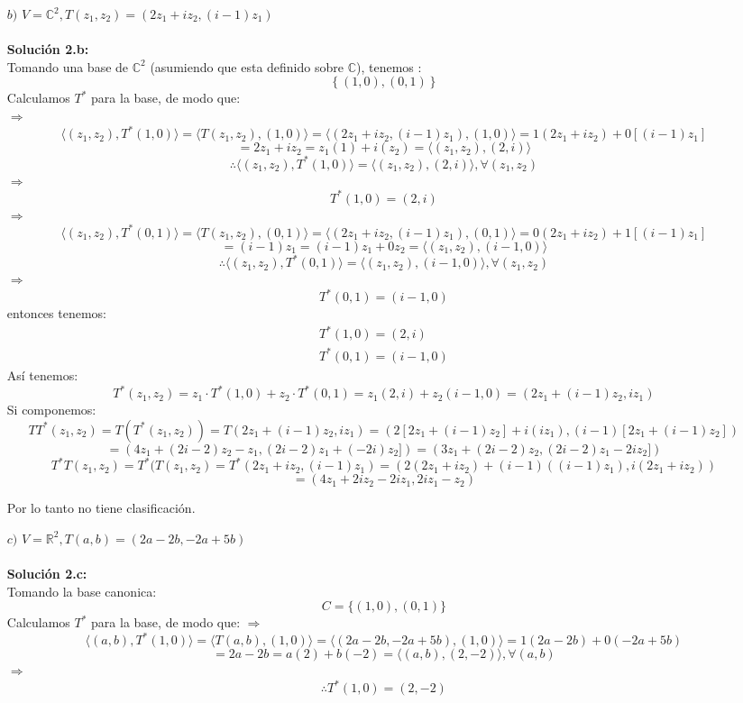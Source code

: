 \begin{itemize}
    \item [$b)$] $V=\mathbb{C}^2, T(z_1,z_2)=(2z_1+iz_2,(i-1)z_1)$\\\\
        \textbf{Soluci\'on 2.b:}\\
        Tomando una base de $\mathbb{C}^2$ (asumiendo que esta definido sobre $\mathbb{C}$), tenemos : $$\left \{ (1,0),(0,1) \right \}$$
        Calculamos $T^*$ para la base, de modo que:\\
        $\Rightarrow$
        $$\langle (z_1,z_2),T^*(1,0)\rangle =\langle T(z_1,z_2),(1,0)\rangle  =\langle (2z_1+iz_2,(i-1)z_1),(1,0)\rangle=1(2z_1+iz_2)+0[(i-1)z_1]$$
        $$=2z_1+iz_2=z_1(1)+i(z_2)=\langle (z_1,z_2),(2,i)\rangle$$
        \[\therefore \langle (z_1,z_2),T^*(1,0)\rangle =\langle (z_1,z_2),(2,i)\rangle , \forall (z_1,z_2)\]
        $\Rightarrow$
        $$T^*(1,0)=(2,i)$$
        $\Rightarrow$
        $$\langle (z_1,z_2),T^*(0,1)\rangle =\langle T(z_1,z_2),(0,1)\rangle  =\langle (2z_1+iz_2,(i-1)z_1),(0,1)\rangle=0(2z_1+iz_2)+1[(i-1)z_1]$$ $$=(i-1)z_1=(i-1)z_1+0z_2=\langle (z_1,z_2),(i-1,0)\rangle$$
        \[\therefore \langle (z_1,z_2),T^*(0,1)\rangle =\langle (z_1,z_2),(i-1,0)\rangle , \forall (z_1,z_2)\]
        $\Rightarrow$
        $$T^*(0,1)=(i-1,0)$$
        entonces tenemos:\\
        \begin{align*}
            T^*(1,0)=(2,i)\\
            T^*(0,1)=(i-1,0)
        \end{align*}
        Así tenemos:
        $$T^*(z_1,z_2)=z_1\cdot T^*(1,0)+z_2\cdot T^*(0,1)=z_1(2,i)+z_2(i-1,0)=(2z_1+(i-1)z_2,iz_1)$$
        Si componemos:
        \[TT^*(z_1,z_2)=T(T^*(z_1,z_2))=T(2z_1+(i-1)z_2,iz_1)=(2[2z_1+(i-1)z_2]+i(iz_1),(i-1)[2z_1+(i-1)z_2])\]
        \[=(4z_1+(2i-2)z_2-z_1,(2i-2)z_1+(-2i)z_2])=(3z_1+(2i-2)z_2,(2i-2)z_1-2iz_2])\]
        \[T^*T(z_1,z_2)=T^*(T(z_1,z_2)=T^*(2z_1+iz_2,(i-1)z_1)=(2(2z_1+iz_2)+(i-1)((i-1)z_1),i(2z_1+iz_2))\]\[=(4z_1+2iz_2-2iz_1,2iz_1-z_2)\]
        
        Por lo tanto no tiene clasificaci\'on.\\
    
    \item [$c)$] $V=\mathbb{R}^2, T(a,b)=(2a-2b,-2a+5b)$ \\\\
        \textbf{Soluci\'on 2.c:}\\
    Tomando la base canonica:
    $$C=\{(1,0),(0,1)\}$$
Calculamos $T^*$ para la base, de modo que:
        $\Rightarrow$
        $$\langle (a,b),T^*(1,0)\rangle =\langle T(a,b),(1,0)\rangle =\langle (2a-2b,-2a+5b),(1,0)\rangle=1(2a-2b)+0(-2a+5b)$$ $$=2a-2b=a(2)+b(-2)=\langle (a,b),(2,-2)\rangle , \forall (a,b)$$
        $\Rightarrow$
        $$\therefore T^*(1,0)=(2,-2)$$


\end{itemize}
